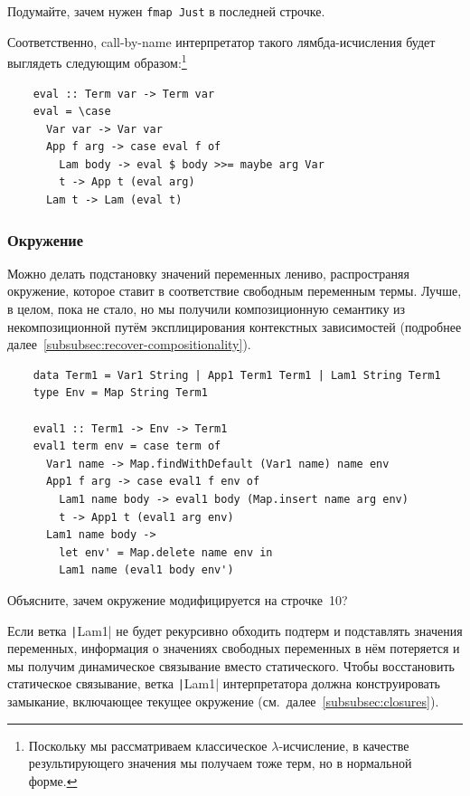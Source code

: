 \begin{task}
    Подумайте, зачем нужен \texttt{fmap Just} в последней строчке.
\end{task}

Соответственно, call-by-name интерпретатор такого лямбда-исчисления будет выглядеть следующим образом:\footnote{Поскольку мы рассматриваем классическое $\lambda$-исчисление, в качестве результирующего значения мы получаем тоже терм, но в нормальной форме.}

\begin{verbatim}
    eval :: Term var -> Term var
    eval = \case
      Var var -> Var var
      App f arg -> case eval f of
        Lam body -> eval $ body >>= maybe arg Var
        t -> App t (eval arg)
      Lam t -> Lam (eval t)
\end{verbatim}

\subsubsection{Окружение}

Можно делать подстановку значений переменных лениво, распространяя окружение, которое ставит в соответствие свободным переменным термы.
Лучше, в целом, пока не стало, но мы получили композиционную семантику из некомпозиционной путём эксплицирования контекстных зависимостей (подробнее далее~\ref{subsubsec:recover-compositionality}).

\begin{verbatim}
    data Term1 = Var1 String | App1 Term1 Term1 | Lam1 String Term1
    type Env = Map String Term1

    eval1 :: Term1 -> Env -> Term1
    eval1 term env = case term of
      Var1 name -> Map.findWithDefault (Var1 name) name env
      App1 f arg -> case eval1 f env of
        Lam1 name body -> eval1 body (Map.insert name arg env)
        t -> App1 t (eval1 arg env)
      Lam1 name body ->
        let env' = Map.delete name env in
        Lam1 name (eval1 body env')
\end{verbatim}

\begin{task}
    Объясните, зачем окружение модифицируется на строчке~10?
\end{task}

Если ветка \texttt|Lam1| не будет рекурсивно обходить подтерм и подставлять значения переменных, информация о значениях свободных переменных в нём потеряется и мы получим динамическое связывание вместо статического.
Чтобы восстановить статическое связывание, ветка \texttt|Lam1| интерпретатора должна конструировать замыкание, включающее текущее окружение (см.\ далее~\ref{subsubsec:closures}).

